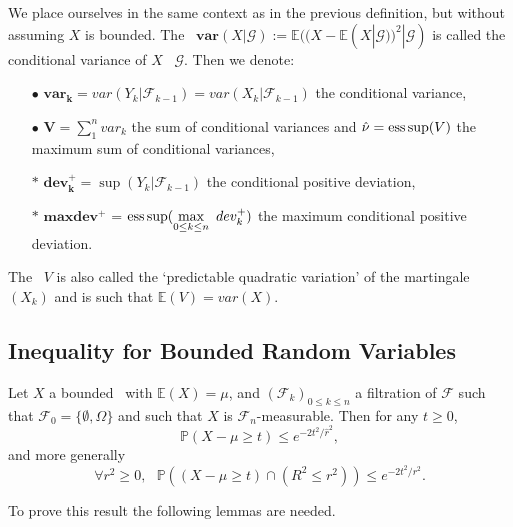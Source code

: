 \begin{notation}
We place ourselves in the same context as in the previous definition, but without assuming $X$ is bounded. The \rv~$\mathbf{var}(X|\mathcal{G}) := \mathbb{E}((X-\mathbb{E}(X|\mathcal{G}))^2|\mathcal{G}) $ is called the conditional variance of $X$ \wrt~$\mathcal{G}$. Then we denote:
\begin{itemize}
\item [$\bullet$] $\mathbf{var_k} = var(Y_k|\mathcal{F}_{k-1})=var(X_k|\mathcal{F}_{k-1})$ the conditional variance, 
\item [$\bullet$] $\mathbf{V} = \sum_{1}^{n} var_k$ the sum of conditional variances and $\hat\nu= \supess(V)$ the maximum sum of conditional variances,
\item [$\ast$] $\mathbf{dev_k^+} = \sup(Y_k|\mathcal{F}_{k-1})$ the conditional positive deviation,
\item  [$\ast$] $\mathbf{maxdev^+} $ = $ \supess(\displaystyle\max_{0 \leq k \leq n}~ dev_k^+)$  the maximum conditional positive deviation.
\end{itemize}
\end{notation}

The \rv~$V$ is also called the `predictable quadratic variation' of the martingale $(X_k)$ and is such that $\mathbb{E}(V)= var(X)$.


\subsection{Inequality for Bounded Random Variables}

\begin{theorem} \citep{McDiarmid98}
\label{3.14}
Let $X$ a bounded \rv~with $\mathbb{E}(X)=\mu$, and $(\mathcal{F}_k)_{0\leq k \leq n}$ a filtration of $\mathcal{F}$ such that $ \mathcal{F}_0 =  \{\emptyset , \Omega\} $ and such that $X$ is $\mathcal{F}_n$-measurable. 
Then for any $t \geq 0$, $$\mathbb{P}(X-\mu \geq t) \leq e^{-2t^2/\hat r^2},$$ and more generally $$\forall r^2 \geq 0,~~~ \mathbb{P}((X-\mu \geq t)\cap(R^2 \leq r^2)) \leq e^{-2t^2/ r^2}.$$
\end{theorem}

To prove this result the following lemmas are needed.


